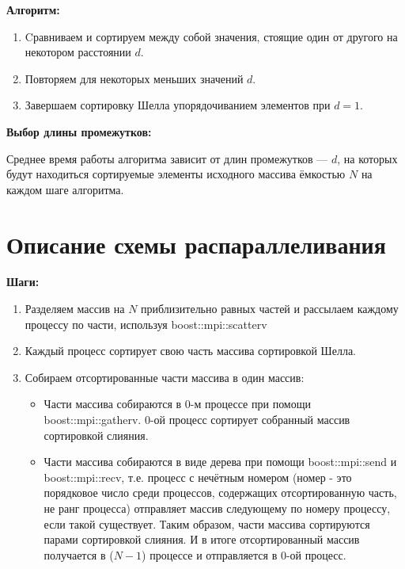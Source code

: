 \documentclass{report}
\begin{document}
\par \textbf{Алгоритм:}

\begin{enumerate}
    \item Cравниваем и сортируем между собой значения, стоящие один от другого на некотором расстоянии ${d}$.
    \item Повторяем для некоторых меньших значений ${d}$.
    \item Завершаем сортировку Шелла упорядочиванием элементов при ${d = 1}$.
\end{enumerate}

\par \textbf{Выбор длины промежутков:}
\par Среднее время работы алгоритма зависит от длин промежутков — ${d}$, на которых будут находиться сортируемые элементы исходного массива ёмкостью ${N}$ на каждом шаге алгоритма.

\newpage

\section* {Описание схемы распараллеливания}
\par \textbf{Шаги:} 
\begin{enumerate}
    \item Разделяем массив на ${N}$ приблизительно равных частей и рассылаем каждому процессу по части,  используя boost::mpi::scatterv
    \item Каждый процесс сортирует свою часть массива сортировкой Шелла.
    \item Собираем отсортированные части массива в один массив:
    \begin{itemize}
        \item Части массива собираются в 0-м процессе при помощи boost::mpi::gatherv. 0-ой процесс сортирует собранный массив сортировкой слияния.
        \item Части массива собираются в виде дерева при помощи  boost::mpi::send и  boost::mpi::recv, т.е. процесс с нечётным номером (номер - это порядковое число среди процессов, содержащих отсортированную часть, не ранг процесса) отправляет массив следующему по номеру процессу, если такой существует. Таким образом, части массива сортируются парами сортировкой слияния. И в итоге отсортированный массив получается в (${N-1}$) процессе и отправляется в 0-ой процесс.
        
    \end{itemize}
\end{enumerate}
\end{document}
